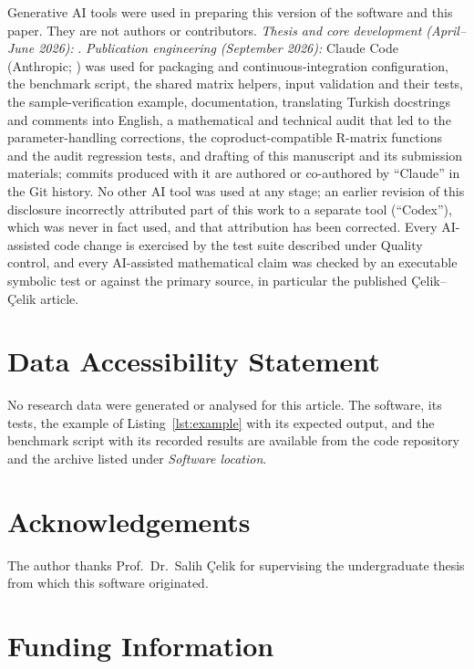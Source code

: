 \documentclass[11pt,a4paper]{article}
\begin{document}
Generative AI tools were used in preparing this version of the software and this paper. They are not authors or contributors. \emph{Thesis and core development (April--June 2026):} \ThesisPeriodAI. \emph{Publication engineering (September 2026):} Claude Code (Anthropic; \ClaudeModel) was used for packaging and continuous-integration configuration, the benchmark script, the shared matrix helpers, input validation and their tests, the sample-verification example, documentation, translating Turkish docstrings and comments into English, a mathematical and technical audit that led to the parameter-handling corrections, the coproduct-compatible R-matrix functions and the audit regression tests, and drafting of this manuscript and its submission materials; commits produced with it are authored or co-authored by ``Claude'' in the Git history. No other AI tool was used at any stage; an earlier revision of this disclosure incorrectly attributed part of this work to a separate tool (``Codex''), which was never in fact used, and that attribution has been corrected. Every AI-assisted code change is exercised by the test suite described under Quality control, and every AI-assisted mathematical claim was checked by an executable symbolic test or against the primary source, in particular the published Çelik--Çelik article. \AIReviewStatement

\section*{Data Accessibility Statement}

No research data were generated or analysed for this article. The software, its tests, the example of Listing~\ref{lst:example} with its expected output, and the benchmark script with its recorded results are available from the code repository and the archive listed under \emph{Software location}.

\section*{Acknowledgements}

The author thanks Prof.\ Dr.\ Salih Çelik for supervising the undergraduate thesis from which this software originated.

\section*{Funding Information}

\FundingText
\end{document}
